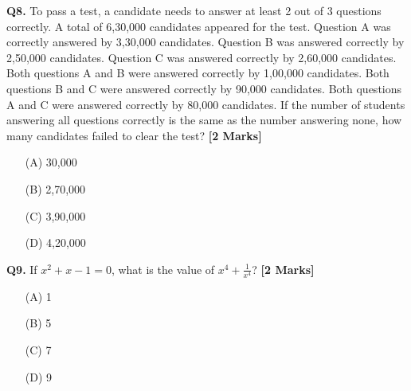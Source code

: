 \documentclass[11pt]{article}
\newcommand{\questionb}[2]{
    \noindent\textbf{Q#2.} #1 \hfill \textbf{[2 Marks]}
}
\begin{document}
\questionb{To pass a test, a candidate needs to answer at least 2 out of 3 questions correctly. A total of 6,30,000 candidates appeared for the test. Question A was correctly answered by 3,30,000 candidates. Question B was answered correctly by 2,50,000 candidates. Question C was answered correctly by 2,60,000 candidates. Both questions A and B were answered correctly by 1,00,000 candidates. Both questions B and C were answered correctly by 90,000 candidates. Both questions A and C were answered correctly by 80,000 candidates. If the number of students answering all questions correctly is the same as the number answering none, how many candidates failed to clear the test?}{8}
\begin{enumerate}
    \item[(A)] 30,000
    \item[(B)] 2,70,000
    \item[(C)] 3,90,000
    \item[(D)] 4,20,000
\end{enumerate}
\vspace{0.5cm}

\questionb{If \( x^2 + x - 1 = 0 \), what is the value of \( x^4 + \frac{1}{x^4} \)?}{9}
\begin{enumerate}
    \item[(A)] 1
    \item[(B)] 5
    \item[(C)] 7
    \item[(D)] 9
\end{enumerate}
\vspace{0.5cm}
\end{document}
